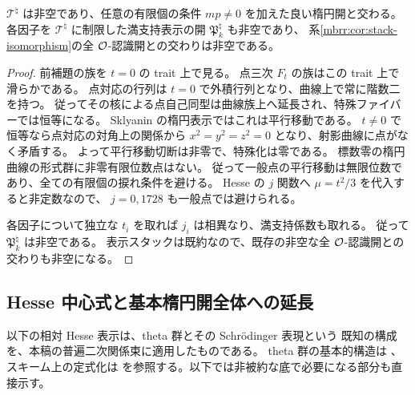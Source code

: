 \begin{proposition}[良い楕円開および全構造対象開との交わり]
\label{mbpl:prop:nonempty-open}
$\mathcal T^\natural$ は非空であり、任意の有限個の条件
$mp\ne0$ を加えた良い楕円開と交わる。
各因子を $\mathcal T^\natural$ に制限した満支持表示の開
$\mathfrak P_k^\natural$ も非空であり、
系\ref{mbrr:cor:stack-isomorphism}の全 $\mathcal O$-認識開との交わりは非空である。
\end{proposition}

\begin{proof}
前補題の族を $t=0$ の trait 上で見る。
点三次 $F_t$ の族はこの trait 上で滑らかである。
点対応の行列は $t=0$ で外積行列となり、曲線上で常に階数二を持つ。
従ってその核による点自己同型は曲線族上へ延長され、特殊ファイバーでは恒等になる。
Sklyanin の楕円表示ではこれは平行移動である。
$t\ne0$ で恒等なら点対応の対角上の関係から
$x^2=y^2=z^2=0$ となり、射影曲線に点がなく矛盾する。
よって平行移動切断は非零で、特殊化は零である。
標数零の楕円曲線の形式群に非零有限位数点はない。
従って一般点の平行移動は無限位数であり、全ての有限個の捩れ条件を避ける。
Hesse の $j$ 関数へ $\mu=t^2/3$ を代入すると非定数なので、
$j=0,1728$ も一般点では避けられる。

各因子について独立な $t_i$ を取れば $j_i$ は相異なり、満支持係数も取れる。
従って $\mathfrak P_k^\natural$ は非空である。
表示スタックは既約なので、既存の非空な全 $\mathcal O$-認識開との交わりも非空になる。
\end{proof}

\subsection{Hesse 中心式と基本楕円開全体への延長}

以下の相対 Hesse 表示は、theta 群とその Schr\"odinger 表現という
既知の構成を、本稿の普遍二次関係束に適用したものである。
theta 群の基本的構造は
\cite[\S1, Theorems~1--2, pp.~293--298]{MBPLMumfordTheta}、
スキーム上の定式化は
\cite[\S2B, equation~(2-1), Lemma~2.8; \S2C]{MBPLShinWeil}
を参照する。以下では非被約な底で必要になる部分も直接示す。

